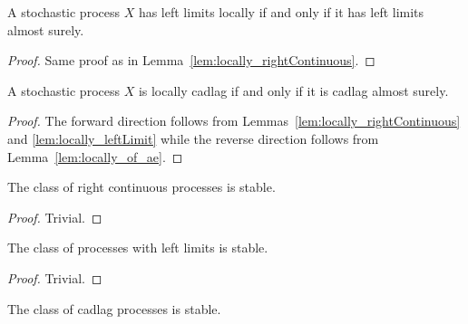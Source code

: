 \begin{lemma}\label{lem:locally_leftLimit}
  \leanok
  A stochastic process $X$ has left limits locally if and only if it has left limits almost surely.
\end{lemma}

\begin{proof}
  \leanok
  Same proof as in Lemma~\ref{lem:locally_rightContinuous}.
\end{proof}

\begin{lemma}\label{lem:locally_isCadlag}
  \leanok
  A stochastic process $X$ is locally cadlag if and only if it is cadlag almost surely.
\end{lemma}

\begin{proof}\leanok
  The forward direction follows from Lemmas~\ref{lem:locally_rightContinuous} and \ref{lem:locally_leftLimit}
  while the reverse direction follows from Lemma~\ref{lem:locally_of_ae}.
\end{proof}

\begin{lemma}\label{lem:isStable_rightContinuous}
  \leanok
  The class of right continuous processes is stable.
\end{lemma}

\begin{proof}\leanok
  Trivial.
\end{proof}

\begin{lemma}\label{lem:isStable_left_limit}
  \leanok
  The class of processes with left limits is stable.
\end{lemma}

\begin{proof}\leanok
  Trivial.
\end{proof}

\begin{lemma}\label{lem:isStable_isCadlag}
  \leanok
  The class of cadlag processes is stable.
\end{lemma}

